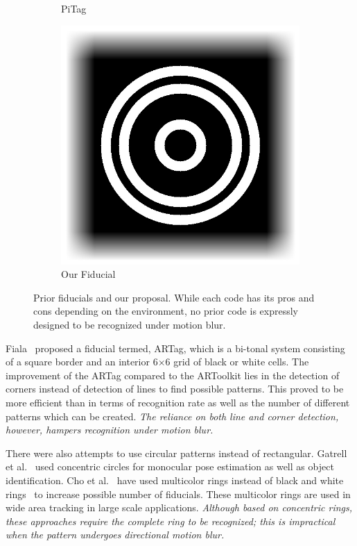 \documentclass[10pt,twocolumn,letterpaper]{article}
\begin{document}
\begin{figure}[b!]
\begin{subfigure}[b]{0.12\linewidth}
  PiTag\quad~\cite{Pitag13}
 \end{subfigure}\quad
 \begin{subfigure}[b]{0.14\linewidth}
  \centering
  \includegraphics[width=\linewidth]{images/our_fiducial}
  Our Fiducial
 \end{subfigure}
 \caption{Prior fiducials and our proposal.  While
 each code has its pros and cons depending on the environment, no
 prior code is expressly designed to be recognized under motion blur.}
 \label{fig:previous_work}
\end{figure}


Fiala~\cite{Fiala05} proposed a fiducial termed, ARTag, which is a
bi-tonal system consisting of a square border and an interior
6$\times$6 grid of black or white cells. The improvement of the ARTag
compared to the ARToolkit lies in the detection of corners instead of
detection of lines to find possible patterns.  This proved to be more
efficient than \cite{ARToolkit02} in terms of recognition rate as well
as the number of different patterns which can be created.  {\it The
reliance on both line and corner detection, however, hampers
recognition under motion blur.}

There were also attempts to use circular patterns instead of
rectangular.  Gatrell et al.~\cite{concentric} used concentric circles
for monocular pose estimation as well as object identification. Cho et
al.~\cite{Cho:2001,Cho97fastcolor} have used multicolor rings instead
of black and white rings~\cite{concentric} to increase possible number
of fiducials.  These multicolor rings are used in wide area tracking
in large scale applications.  {\it Although based on  concentric rings, these
approaches require the complete ring to be recognized; this is
impractical when the pattern undergoes directional motion blur.}
\end{document}
